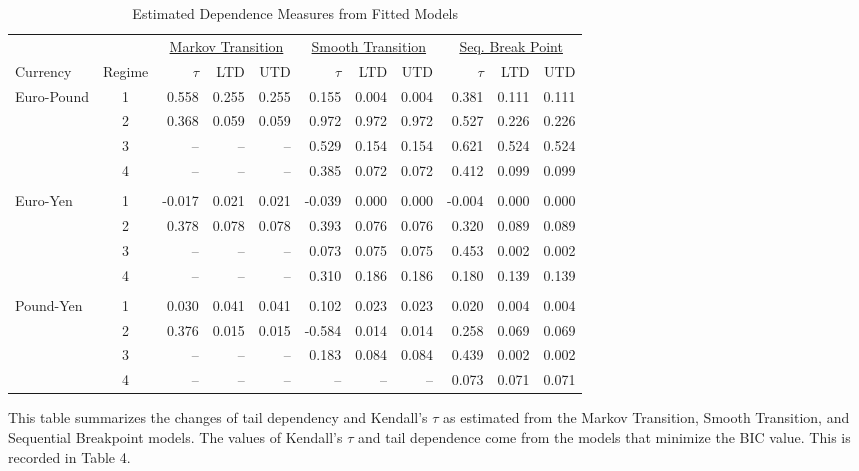 \documentclass[12pt]{article}
\begin{document}
\begin{landscape}
\begin{table}
	\centering
	\caption{Estimated Dependence Measures from Fitted Models}
	\begin{tabular}[c]{l c r r r | r r r | r r r}
		\midrule
		         &        & \multicolumn{3}{c}{\underline{Markov Transition}} & \multicolumn{3}{c}{\underline{Smooth Transition}} & \multicolumn{3}{c}{\underline{Seq. Break Point}} \\
		Currency & Regime & $\tau$ & LTD & UTD & $\tau$ & LTD & UTD & $\tau$ & LTD & UTD \\
		\midrule
		Euro-Pound  & 1 &  0.558 & 0.255 & 0.255 &  0.155 & 0.004 & 0.004 &  0.381 & 0.111 & 0.111 \\
					& 2 &  0.368 & 0.059 & 0.059 &  0.972 & 0.972 & 0.972 &  0.527 & 0.226 & 0.226 \\
					& 3 &     -- &    -- &    -- &  0.529 & 0.154 & 0.154 &  0.621 & 0.524 & 0.524 \\
					& 4 &     -- &    -- &    -- &  0.385 & 0.072 & 0.072 &  0.412 & 0.099 & 0.099 \\ \\
		Euro-Yen    & 1 & -0.017 & 0.021 & 0.021 & -0.039 & 0.000 & 0.000 & -0.004 & 0.000 & 0.000 \\
					& 2 &  0.378 & 0.078 & 0.078 &  0.393 & 0.076 & 0.076 &  0.320 & 0.089 & 0.089 \\
					& 3 &     -- &    -- &    -- &  0.073 & 0.075 & 0.075 &  0.453 & 0.002 & 0.002 \\
					& 4 &     -- &    -- &    -- &  0.310 & 0.186 & 0.186 &  0.180 & 0.139 & 0.139 \\ \\
		Pound-Yen   & 1 &  0.030 & 0.041 & 0.041 &  0.102 & 0.023 & 0.023 &  0.020 & 0.004 & 0.004 \\
		            & 2 &  0.376 & 0.015 & 0.015 & -0.584 & 0.014 & 0.014 &  0.258 & 0.069 & 0.069 \\
		            & 3 &     -- &    -- &    -- &  0.183 & 0.084 & 0.084 &  0.439 & 0.002 & 0.002 \\
		            & 4 &     -- &    -- &    -- &     -- &    -- &    -- &  0.073 & 0.071 & 0.071 \\
		\hline
	\end{tabular}
	\begin{tablenotes}
		\item{\footnotesize This table summarizes the changes of tail dependency and Kendall's $\tau$ as estimated from the Markov Transition, Smooth Transition, and Sequential Breakpoint models. The values of Kendall's $\tau$ and tail dependence come from the models that minimize the BIC value. This is recorded in Table 4.}
	\end{tablenotes}
	\label{tbl:dependence_measure_summary}
\end{table}

\end{landscape}
\end{document}
